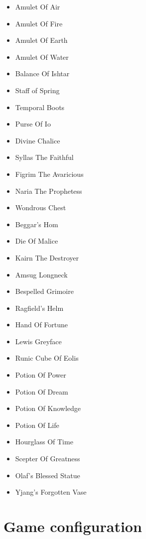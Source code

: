     \begin{multicols}{2}
    \begin{itemize}
        \item Amulet Of Air
        \item Amulet Of Fire
        \item Amulet Of Earth
        \item Amulet Of Water
        \item Balance Of Ishtar
        \item Staff of Spring
        \item Temporal Boots
        \item Purse Of Io
        \item Divine Chalice
        \item Syllas The Faithful
        \item Figrim The Avaricious
        \item Naria The Prophetess
        \item Wondrous Chest
        \item Beggar's Hom
        \item Die Of Malice
        \item Kairn The Destroyer
        \item Amsug Longneck
        \item Bespelled Grimoire
        \item Ragfield's Helm
        \item Hand Of Fortune 
        \item Lewis Greyface
        \item Runic Cube Of Eolis
        \item Potion Of Power
        \item Potion Of Dream
        \item Potion Of Knowledge
        \item Potion Of Life
        \item Hourglass Of Time
        \item Scepter Of Greatness
        \item Olaf's Blessed Statue
        \item Yjang's Forgotten Vase
        
    \end{itemize}
    \end{multicols}

\section{Game configuration}

